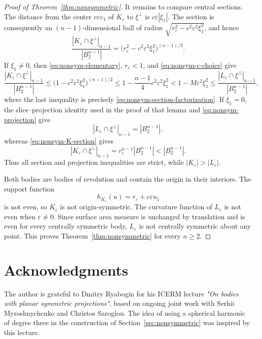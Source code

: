 \documentclass[11pt]{article}
\theoremstyle{remark}
\begin{document}
\begin{proof}[Proof of Theorem~\ref{thm:nonsymmetric}]
It remains to compare central sections.  The distance from the center
$c\varepsilon e_1$ of $K_\varepsilon$ to $\xi^\perp$ is
$c\varepsilon|\xi_1|$.  The section is consequently an $(n-1)$-dimensional
ball of radius
$\sqrt{r_\varepsilon^2-c^2\varepsilon^2\xi_1^2}$, and hence
\begin{equation}\label{eq:nonsym-K-section}
 \frac{|K_\varepsilon\cap\xi^\perp|_{n-1}}{|B_2^{n-1}|}
 =\bigl(r_\varepsilon^2-c^2\varepsilon^2\xi_1^2\bigr)^{(n-1)/2}.
\end{equation}
If $\xi_1\ne0$, then \eqref{eq:nonsym-elementary},
$r_\varepsilon<1$, and \eqref{eq:nonsym-c-choice} give
\begin{equation*}
 \frac{|K_\varepsilon\cap\xi^\perp|_{n-1}}{|B_2^{n-1}|}
 \leq
 \bigl(1-c^2\varepsilon^2\xi_1^2\bigr)^{(n-1)/2}\leq1-\frac{n-1}{4}c^2\varepsilon^2\xi_1^2<1-M\varepsilon^2\xi_1^2
 \leq
 \frac{|L_\varepsilon\cap\xi^\perp|_{n-1}}{|B_2^{n-1}|},
\end{equation*}
where the last inequality is precisely
\eqref{eq:nonsym-section-factorization}.  If $\xi_1=0$, the slice--projection
identity used in the proof of that lemma and
\eqref{eq:nonsym-projection} give
\[
 |L_\varepsilon\cap\xi^\perp|_{n-1}=|B_2^{n-1}|,
\]
whereas \eqref{eq:nonsym-K-section} gives
\[
 |K_\varepsilon\cap\xi^\perp|_{n-1}
 =r_\varepsilon^{n-1}|B_2^{n-1}|<|B_2^{n-1}|.
\]
Thus all section and projection inequalities are strict, while
$|K_\varepsilon|>|L_\varepsilon|$.

Both bodies are bodies of revolution and contain the origin in their
interiors.  The support function
\[
 h_{K_\varepsilon}(u)=r_\varepsilon+c\varepsilon u_1
\]
is not even, so $K_\varepsilon$ is not origin-symmetric.  The curvature
function of $L_\varepsilon$ is not even when $\varepsilon\ne0$.  Since surface area
measure is unchanged by translation and is even for every centrally
symmetric body, $L_\varepsilon$ is not centrally symmetric about any point.
This proves Theorem~\ref{thm:nonsymmetric} for every $n\geq2$.
\end{proof}





\section*{Acknowledgments}
The author is grateful to Dmitry Ryabogin for his ICERM lecture
\emph{"On bodies with planar symmetric projections"}, based on ongoing joint
work with Serhii Myroshnychenko and Christos Saroglou.  The idea of using a
spherical harmonic of degree three in the construction of
Section~\ref{sec:nonsymmetric} was inspired by this lecture.
\end{document}
